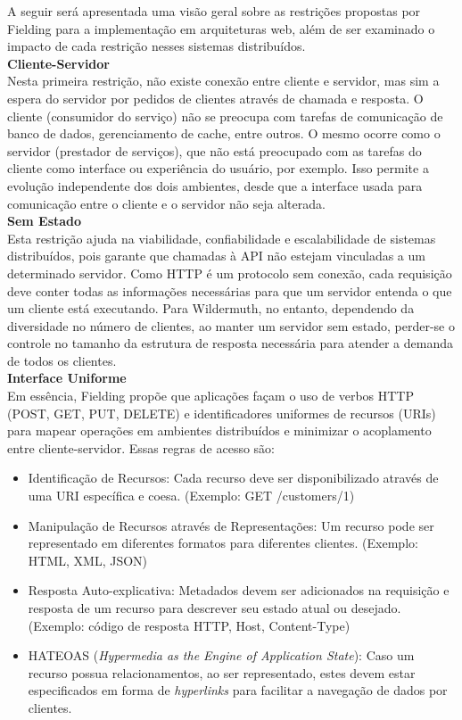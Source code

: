 A seguir será apresentada uma visão geral sobre as restrições propostas por Fielding para a implementação em arquiteturas web, além de ser examinado o impacto de cada restrição nesses sistemas distribuídos. \\

\textbf{Cliente-Servidor} \\

Nesta primeira restrição, não existe conexão entre cliente e servidor, mas sim a espera do servidor por pedidos de clientes através de chamada e resposta. O cliente (consumidor do serviço) não se preocupa com tarefas de comunicação de banco de dados, gerenciamento de cache, entre outros. O mesmo ocorre como o servidor (prestador de serviços), que não está preocupado com as tarefas do cliente como interface ou experiência do usuário, por exemplo. Isso permite a evolução independente dos dois ambientes, desde que a interface usada para comunicação entre o cliente e o servidor não seja alterada. \cite{Fielding2000} \\

\textbf{Sem Estado} \\

Esta restrição ajuda na viabilidade, confiabilidade e escalabilidade de sistemas distribuídos, pois garante que chamadas à API não estejam vinculadas a um determinado servidor. Como HTTP é um protocolo sem conexão, cada requisição deve conter todas as informações necessárias para que um servidor entenda o que um cliente está executando. Para Wildermuth, no entanto, dependendo da diversidade no número de clientes, ao manter um servidor sem estado, perder-se o controle no tamanho da estrutura de resposta necessária para atender a demanda de todos os clientes. \cite{Wildermuth2015} \\

\textbf{Interface Uniforme} \\

Em essência, Fielding propõe que aplicações façam o uso de verbos HTTP (POST, GET, PUT, DELETE) e identificadores uniformes de recursos (URIs) para mapear operações em ambientes distribuídos e minimizar o acoplamento entre cliente-servidor. Essas regras de acesso são: \cite{Fielding2000}

\begin{itemize}[noitemsep]
\item Identificação de Recursos: Cada recurso deve ser disponibilizado através de uma URI específica e coesa. (Exemplo: GET /customers/1)
\item Manipulação de Recursos através de Representações: Um recurso pode ser representado em diferentes formatos para diferentes clientes. (Exemplo: HTML, XML, JSON)
\item Resposta Auto-explicativa: Metadados devem ser adicionados na requisição e resposta de um recurso para descrever seu estado atual ou desejado. (Exemplo: código de resposta HTTP, Host, Content-Type)
\item HATEOAS (\textit{Hypermedia as the Engine of Application State}): Caso um recurso possua relacionamentos, ao ser representado, estes devem estar especificados em forma de \textit{hyperlinks} para facilitar a navegação de dados por clientes.
\end{itemize}

